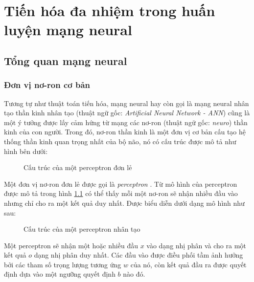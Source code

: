 \chapter{Tiến hóa đa nhiệm trong huấn luyện mạng neural}
\label{mfea2}
% 
% 
\section{Tổng quan mạng neural}
    \subsection{Đơn vị nơ-ron cơ bản}
    Tương tự như thuật toán tiến hóa, mạng neural hay còn gọi là mạng neural nhân tạo thần kinh nhân tạo (thuật ngữ gốc: \emph{Artificial Neural Network - ANN}) \cite{hassoun1995fundamentals} cũng là một ý tưởng được lấy cảm hứng từ mạng các nơ-ron (thuật ngữ gốc: \emph{neuro}) thần kinh của con người. Trong đó, nơ-ron thần kinh là một đơn vị cơ bản cấu tạo hệ thống thần kinh quan trọng nhất của bộ não, nó có cấu trúc được mô tả như hình bên dưới:
    \begin{figure}[ht]
        \centering
        \caption{Cấu trúc của một perceptron đơn lẻ}
        \label{fig:problem:human-neuron}
    \end{figure}
    Một đơn vị nơ-ron đơn lẻ được gọi là \emph{perceptron} \cite{stephen1990perceptron}. Từ mô hình của perceptron được mô tả trong hình \ref{fig:problem:human-neuron} có thể thấy mỗi một nơ-ron sẽ nhận nhiều đầu vào nhưng chỉ cho ra một kết quả duy nhất. Được biểu diễn dưới dạng mô hình như sau:
    \begin{figure}[ht]
        \centering
        \caption{Cấu trúc của một perceptron nhân tạo}
        \label{fig:problem:perceptron}
    \end{figure}
    Một perceptron sẽ nhận một hoặc nhiều đầu $x$ vào dạng nhị phân và cho ra một kết quả $o$ dạng nhị phân duy nhất. Các đầu vào được điều phối tầm ảnh hưởng bởi các tham số trọng lượng tương ứng $w$ của nó, còn kết quả đầu ra được quyết định dựa vào một ngưỡng quyết định $b$ nào đó.
